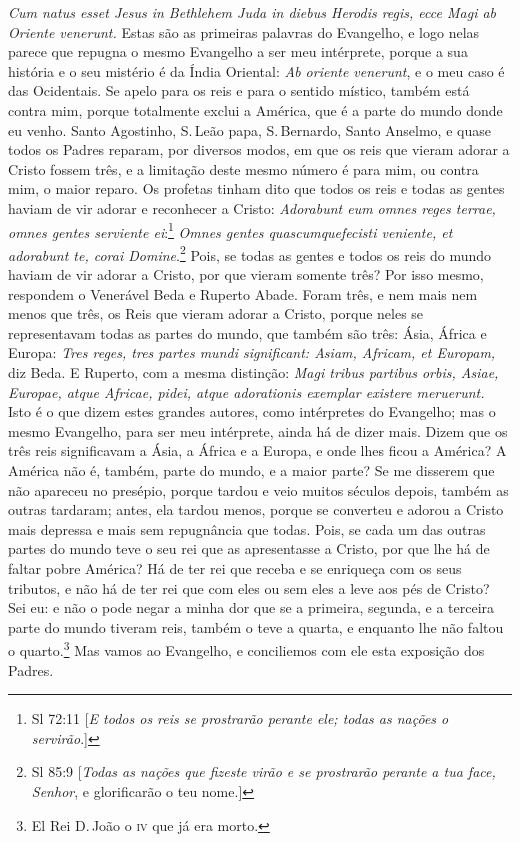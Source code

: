\emph{Cum natus esset Jesus in Bethlehem Juda in diebus Herodis regis,
ecce Magi ab Oriente venerunt.} Estas são as primeiras palavras do
Evangelho, e logo nelas parece que repugna o mesmo Evangelho a ser meu
intérprete, porque a sua história e o seu mistério é da Índia Oriental:
\emph{Ab oriente venerunt}, e o meu caso é das Ocidentais. Se apelo
para os reis e para o sentido místico, também está contra mim, porque
totalmente exclui a América, que é a parte do mundo donde eu venho.
Santo Agostinho, S.\,Leão papa, S.\,Bernardo, Santo Anselmo, e quase todos
os Padres reparam, por diversos modos, em que os reis que vieram adorar
a Cristo fossem três, e a limitação deste mesmo número é para mim, ou
contra mim, o maior reparo. Os profetas tinham dito que todos os reis e
todas as gentes haviam de vir adorar e reconhecer a Cristo:
\emph{Adorabunt eum omnes reges terrae, omnes gentes serviente ei}:\footnote{Sl 72:11 [\emph{E todos os reis se prostrarão perante ele; todas as nações o servirão}.]}
\emph{Omnes gentes quascumquefecisti veniente, et
adorabunt te, corai Domine}.\footnote{Sl 85:9 [\emph{Todas as nações que fizeste virão e se prostrarão perante a tua face, Senhor}, e glorificarão o teu nome.]} Pois, se todas as
gentes e todos os reis do mundo haviam de vir adorar a Cristo, por que
vieram somente três? Por isso mesmo, respondem o Venerável Beda e
Ruperto Abade. Foram três, e nem mais nem menos que três, os Reis que
vieram adorar a Cristo, porque neles se
representavam todas as partes do mundo, que também são três: Ásia,
África e Europa: \emph{Tres reges, tres partes mundi significant: Asiam,
Africam, et Europam,} diz Beda. E Ruperto, com a mesma distinção:
\emph{Magi tribus partibus orbis, Asiae, Europae, atque Africae, pidei,
atque adorationis exemplar existere meruerunt.} Isto é o que dizem estes
grandes autores, como intérpretes do Evangelho; mas o mesmo Evangelho,
para ser meu intérprete, ainda há de dizer mais. Dizem que os três reis
significavam a Ásia, a África e a Europa, e onde lhes ficou a América? A
América não é, também, parte do mundo, e a maior parte? Se me disserem
que não apareceu no presépio, porque tardou e veio muitos séculos
depois, também as outras tardaram; antes, ela tardou menos, porque se
converteu e adorou a Cristo mais depressa e mais sem repugnância que
todas. Pois, se cada um das outras partes do mundo teve o seu rei que as
apresentasse a Cristo, por que lhe há de faltar pobre América? Há de ter
rei que receba e se enriqueça com os seus tributos, e não há de ter rei
que com eles ou sem eles a leve aos pés de Cristo? Sei eu: e não o
pode negar a minha dor que se a primeira, segunda, e a terceira parte do
mundo tiveram reis, também o teve a quarta, e enquanto lhe não faltou o
quarto.\footnote{El Rei D.\,João o \textsc{iv} que já era morto.} Mas vamos ao Evangelho, e conciliemos com ele
esta exposição dos Padres.

